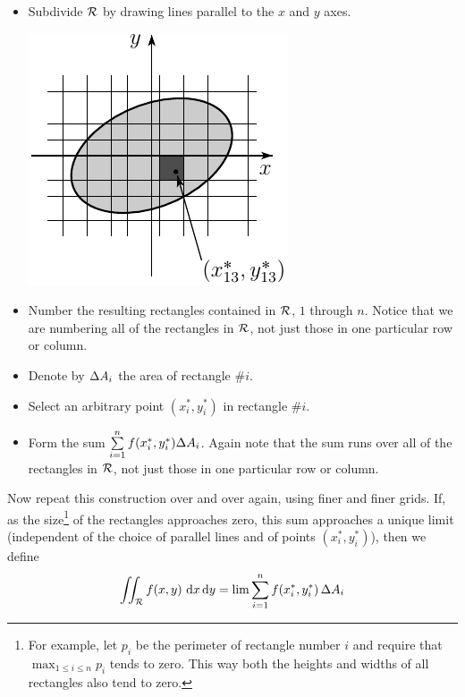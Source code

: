 \begin{itemize}
\item
Subdivide $\mathcal{R}$ by drawing lines parallel to the $x$ and $y$ axes.
\begin{efig}
\begin{center}
   \includegraphics{intDecomp2.pdf}
\end{center}
\end{efig}

\item
Number the resulting rectangles contained in $\mathcal{R}$, $1$ through $n$.
Notice that we are numbering all of the rectangles in $\mathcal{R}$, not just those 
in one particular row or column.
\item
Denote by $\Delta A_i$ the area of rectangle $\# i$.
\item
Select an arbitrary point $(x_i^*,y_i^*)$ in rectangle $\# i$.
\item
Form the sum $\sum\limits_{i=1}^n f(x_i^*,y_i^*) \Delta A_i $.
Again note that the sum runs over all of the rectangles in $\mathcal{R}$, 
not just those  in one particular row or column.
\end{itemize}
\noindent 
Now repeat this construction over and over again, using finer and 
finer grids. If, as the size\footnote{For example, let $p_i$ be the perimeter 
of rectangle number $i$ and require that $\max_{1\le i\le n} p_i$ tends
to zero. This way both the heights and widths of all rectangles 
also tend to zero.} of the rectangles approaches zero, 
this sum approaches a unique limit (independent of the choice
of parallel lines and of points $(x_i^*,y_i^*)$),  then we define
\begin{equation*}
\dblInt_\cR f(x,y)\ \dee{x}\,\dee{y}
   =\lim \sum_{i=1}^n f(x_i^*,y_i^*)\,\De A_i
\end{equation*}

